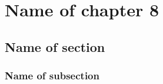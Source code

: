 

\graphicspath{{8/figures/}} %


\chapter{\label{ch8}Name of chapter 8} %

\section{\label{8:1}Name of section}

\subsection{\label{8:1:1}Name of subsection}




